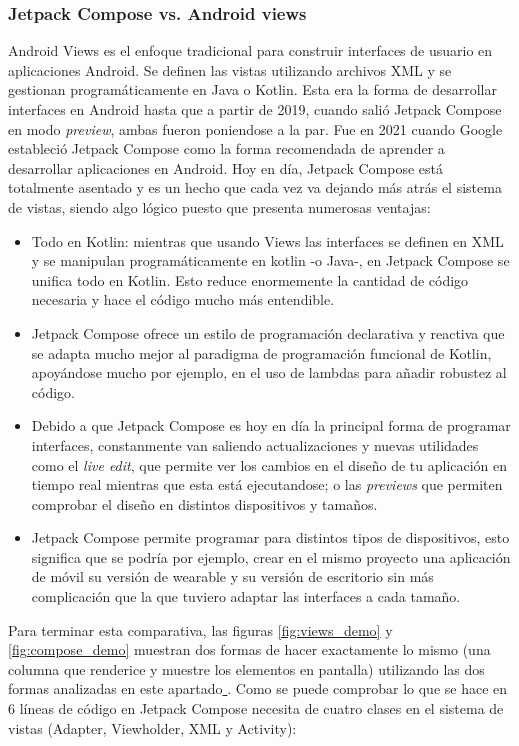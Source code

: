 \subsubsection{Jetpack Compose vs. Android views}
Android Views es el enfoque tradicional para construir interfaces de usuario en aplicaciones Android. Se definen las vistas  utilizando archivos XML y se gestionan programáticamente en Java o Kotlin. Esta era la forma de desarrollar interfaces en Android hasta que a partir de 2019, cuando salió Jetpack Compose en modo \textit{preview}, ambas fueron poniendose a la par. Fue en 2021 cuando Google estableció Jetpack Compose como la forma recomendada de aprender a desarrollar aplicaciones en Android. Hoy en día, Jetpack Compose está totalmente asentado y es un hecho que cada vez va dejando más atrás el sistema de vistas, siendo algo lógico puesto que presenta numerosas ventajas:
\begin{itemize}
    \item Todo en Kotlin: mientras que usando Views las interfaces se definen en XML y se manipulan programáticamente en kotlin -o Java-, en Jetpack Compose se unifica todo en Kotlin. Esto reduce enormemente la cantidad de código necesaria y hace el código mucho más entendible.
    \item Jetpack Compose ofrece un estilo de programación declarativa y reactiva que se adapta mucho mejor al paradigma de programación funcional de Kotlin, apoyándose mucho por ejemplo, en el uso de 
	lambdas\hyperlink{cap:biblio}{} para añadir robustez al código.
    \item Debido a que Jetpack Compose es hoy en día la principal forma de programar interfaces, constanmente van saliendo actualizaciones y nuevas utilidades como el \textit{live edit}, que permite ver los cambios en el diseño de tu aplicación en tiempo real mientras que esta está ejecutandose; o las \textit{previews} que permiten comprobar el diseño en distintos dispositivos y tamaños.
    \item Jetpack Compose permite programar para distintos tipos de dispositivos, esto significa que se podría por ejemplo, crear en el mismo proyecto una aplicación de móvil su versión de wearable y su versión de escritorio sin más complicación que la que tuviero adaptar las interfaces a cada tamaño.
\end{itemize}
Para terminar esta comparativa, las figuras \ref{fig:views_demo} y \ref{fig:compose_demo} muestran dos formas de hacer exactamente lo mismo (una columna que renderice y muestre los elementos en pantalla) utilizando las dos formas analizadas en este apartado\hyperlink{cap:biblio}{
	}. Como se puede comprobar lo que se hace en 6 líneas de código en Jetpack Compose necesita de cuatro clases en el sistema de vistas (Adapter, Viewholder, XML y Activity):
